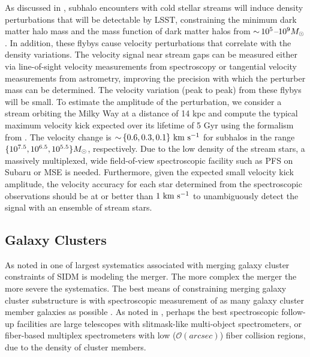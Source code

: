 As discussed in , subhalo encounters with cold stellar streams will induce density perturbations that will be detectable by LSST, constraining the minimum dark matter halo mass and the mass function of dark matter halos from $ {\sim}\,10^5$--$10^9 M_\odot$. In addition, these flybys cause velocity perturbations that correlate with the density variations.  The velocity signal near stream gaps can be measured either via line-of-sight velocity measurements from spectroscopy or tangential velocity measurements from astrometry, improving the precision with which the perturber mass can be determined.
The velocity variation (peak to peak) from these flybys will be small. To estimate the amplitude of the perturbation, we consider a stream orbiting the Milky Way at a distance of 14 kpc and compute the typical maximum velocity kick expected over its lifetime of 5 Gyr using the formalism from \citet{erkal2016}.  The velocity change is $ {\sim}\, \{0.6, 0.3, 0.1\} \mathrm{\,\mathrm{\,km}\,\mathrm{\,s}^{-1}}$ for subhalos in the range $\{ 10^{7.5}, 10^{6.5}, 10^{5.5} \} M_\odot$, respectively. %
Due to the low density of the stream stars, a massively multiplexed, wide field-of-view spectroscopic facility such as PFS on Subaru or MSE is needed. Furthermore, given the expected small velocity kick amplitude, the velocity accuracy for each star determined from the spectroscopic observations should be at or better than $1 \mathrm{\,\mathrm{\,km}\,\mathrm{\,s}^{-1}}$ to unambiguously detect the signal with an ensemble of stream stars.

\subsection{Galaxy Clusters }
As noted in  one of largest systematics associated with merging galaxy cluster constraints of SIDM is modeling the merger. The more complex the merger the more severe the systematics.
The best means of constraining merging galaxy cluster substructure is with spectroscopic measurement of as many galaxy cluster member galaxies as possible \citep[\eg,][]{Golovich:2018}.
As noted in \citet{2016arXiv161001661N}, perhaps the best spectroscopic follow-up facilities are large telescopes with slitmask-like multi-object spectrometers, or fiber-based multiplex spectrometers with low ($\mathcal{O}(\unit{arcsec})$) fiber collision regions, due to the density of cluster members.

